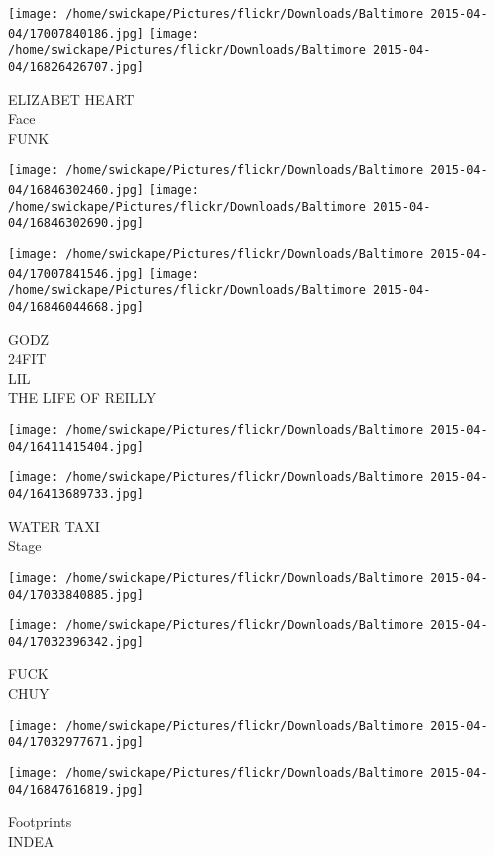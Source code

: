 \documentclass[10pt,letterpaper]{article}
\begin{document}
\vspace{0.25in}
\texttt{[image: /home/swickape/Pictures/flickr/Downloads/Baltimore 2015-04-04/17007840186.jpg]}
\texttt{[image: /home/swickape/Pictures/flickr/Downloads/Baltimore 2015-04-04/16826426707.jpg]}

ELIZABET HEART\\
Face\\
FUNK
\pagebreak

\texttt{[image: /home/swickape/Pictures/flickr/Downloads/Baltimore 2015-04-04/16846302460.jpg]}
\texttt{[image: /home/swickape/Pictures/flickr/Downloads/Baltimore 2015-04-04/16846302690.jpg]}

\texttt{[image: /home/swickape/Pictures/flickr/Downloads/Baltimore 2015-04-04/17007841546.jpg]}
\texttt{[image: /home/swickape/Pictures/flickr/Downloads/Baltimore 2015-04-04/16846044668.jpg]}

GODZ\\
24FIT\\
LIL\\
THE LIFE OF REILLY
\pagebreak

\texttt{[image: /home/swickape/Pictures/flickr/Downloads/Baltimore 2015-04-04/16411415404.jpg]}

\vspace{0.25in}
\texttt{[image: /home/swickape/Pictures/flickr/Downloads/Baltimore 2015-04-04/16413689733.jpg]}

WATER TAXI\\
Stage
\pagebreak

\texttt{[image: /home/swickape/Pictures/flickr/Downloads/Baltimore 2015-04-04/17033840885.jpg]}

\vspace{0.25in}
\texttt{[image: /home/swickape/Pictures/flickr/Downloads/Baltimore 2015-04-04/17032396342.jpg]}

FUCK\\
CHUY
\pagebreak

\texttt{[image: /home/swickape/Pictures/flickr/Downloads/Baltimore 2015-04-04/17032977671.jpg]}

\vspace{0.25in}
\texttt{[image: /home/swickape/Pictures/flickr/Downloads/Baltimore 2015-04-04/16847616819.jpg]}

Footprints\\
INDEA
\pagebreak
\end{document}
